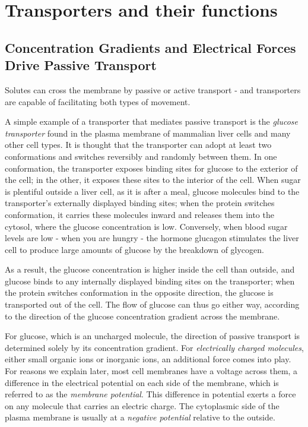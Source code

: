 \section{Transporters and their functions}

\subsection{Concentration Gradients and Electrical Forces Drive Passive Transport}

Solutes can cross the membrane by passive or active transport - and
transporters are capable of facilitating both types of movement.

A simple example of a transporter that mediates passive transport
is the \textit{glucose transporter} found in the plasma membrane of mammalian
liver cells and many other cell types. It is thought that the
transporter can adopt at least two conformations and switches reversibly
and randomly between them. In one conformation, the transporter
exposes binding sites for glucose to the exterior of the cell; in the other, it
exposes these sites to the interior of the cell.
When sugar is plentiful outside a liver cell, as it is after a meal, glucose
molecules bind to the transporter’s externally displayed binding sites;
when the protein switches conformation, it carries these molecules
inward and releases them into the cytosol, where the glucose concentration
is low. Conversely, when blood sugar levels are low - when you
are hungry - the hormone glucagon stimulates the liver cell to produce
large amounts of glucose by the breakdown of glycogen. 

As a result, the
glucose concentration is higher inside the cell than outside, and glucose
binds to any internally displayed binding sites on the transporter; when
the protein switches conformation in the opposite direction, the glucose
is transported out of the cell. The flow of glucose can thus go either way,
according to the direction of the glucose concentration gradient across
the membrane.

For glucose, which is an uncharged molecule, the direction of passive
transport is determined solely by its concentration gradient. For \textit{electrically
charged molecules}, either small organic ions or inorganic ions, an
additional force comes into play. For reasons we explain later, most cell
membranes have a voltage across them, a difference in the electrical
potential on each side of the membrane, which is referred to as the \textit{membrane
potential}. This difference in potential exerts a force on any molecule
that carries an electric charge. The cytoplasmic side of the plasma membrane
is usually at a \textit{negative potential} relative to the outside.

